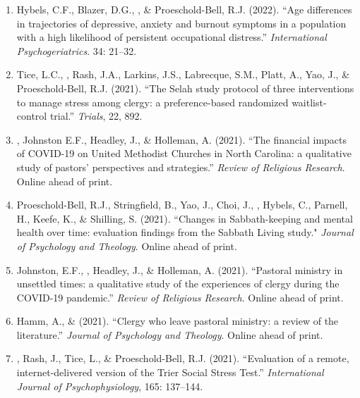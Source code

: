 \begin{enumerate}
\item Hybels, C.F., Blazer, D.G., \Eagle, \& Proeschold-Bell, R.J. (2022). ``Age differences in trajectories of depressive, anxiety and burnout symptoms in a population with a high likelihood of persistent occupational distress.'' \emph{International Psychogeriatrics}. 34: 21--32. 

\item Tice, L.C., \Eagle, Rash, J.A., Larkins, J.S., Labrecque, S.M., Platt, A., Yao, J., \& Proeschold-Bell, R.J. (2021). ``The Selah study protocol of three interventions to manage stress among clergy: a preference-based randomized waitlist-control trial.''  \textit{Trials}, 22, 892. 
	
\item \Eagle, Johnston E.F., Headley, J., \& Holleman, A. (2021). ``The financial impacts of COVID-19 on United Methodist Churches in North Carolina: a qualitative study of pastors’ perspectives and strategies.'' \emph{Review of Religious Research}. Online ahead of print. 

\item Proeschold-Bell, R.J., Stringfield, B., Yao, J., Choi, J., \Eagle, Hybels, C., Parnell, H., Keefe, K., \& Shilling, S. (2021). ``Changes in Sabbath-keeping and mental health over time: evaluation findings from the Sabbath Living study." \textit{Journal of Psychology and Theology}. Online ahead of print. 
	
\item Johnston, E.F., \Eagle, Headley, J., \& Holleman, A. (2021). ``Pastoral ministry in unsettled times: a qualitative study of the experiences of clergy during the COVID-19 pandemic.'' \textit{Review of Religious Research}. Online ahead of print. 

\item Hamm, A., \&  \Eagle \CF \hspace{.01em} (2021). ``Clergy who leave pastoral ministry: a review of the literature.'' \textit{Journal of Psychology and Theology}. Online ahead of print. 

\item \Eagle, Rash, J., Tice, L., \& Proeschold-Bell, R.J. (2021). ``Evaluation of a remote, internet-delivered version of the Trier Social Stress Test.'' \textit{International Journal of Psychophysiology}, 165: 137--144. 


\end{enumerate}

